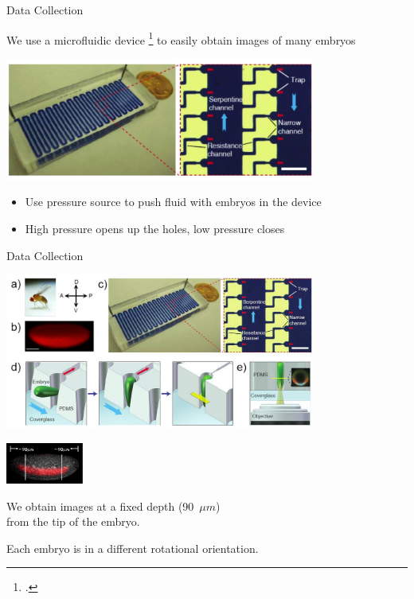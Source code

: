 \documentclass[10pt]{beamer}
\begin{document}
\begin{frame}{Data Collection}

\begin{center}
We use a microfluidic device \footcite{chung2010microfluidic} to easily obtain images of many embryos

\includegraphics[width=4in]{drosophila_imaging_setup_close}
\end{center}

\begin{itemize}
\item Use pressure source to push fluid with embryos in the device
\item High pressure opens up the holes, low pressure closes
\end{itemize}

\end{frame}

\begin{frame}{Data Collection}

\begin{center}
\includegraphics[width=4in]{drosophila_imaging_setup}

\vspace{0.2in}

\begin{minipage}[b]{1.1in}
\includegraphics[width=1in]{imaging_depth}
\end{minipage}
%
\begin{minipage}[b]{0.65\textwidth}
We obtain images at a fixed depth (90~$\mu m$) \\from the tip of the embryo.

Each embryo is in a different rotational orientation.
\end{minipage}

\end{center}

\end{frame}
\end{document}
